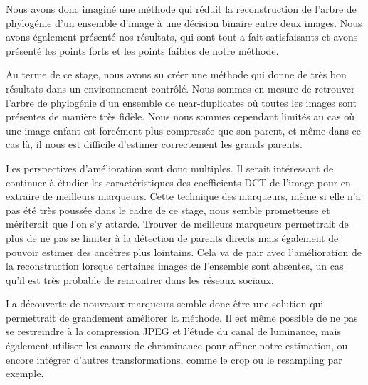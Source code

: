 \documentclass[utf8,final]{stageM2R} %
\begin{document}
Nous avons donc imaginé une méthode qui réduit la reconstruction de l'arbre de phylogénie d'un ensemble d'image à une décision binaire entre deux images. Nous avons également présenté nos résultats, qui sont tout a fait satisfaisants et avons présenté les points forts et les points faibles de notre méthode. 

Au terme de ce stage, nous avons su créer une méthode qui donne de très bon résultats dans un environnement contrôlé. Nous sommes en mesure de retrouver l'arbre de phylogénie d'un ensemble de near-duplicates où toutes les images sont présentes de manière très fidèle. Nous nous sommes cependant limités au cas où une image enfant est forcément plus compressée que son parent, et même dans ce cas là, il nous est difficile d'estimer correctement les grands parents. 

Les perspectives d'amélioration sont donc multiples. Il serait intéressant de continuer à étudier les caractéristiques des coefficients DCT de l'image pour en extraire de meilleurs marqueurs. Cette technique des marqueurs, même si elle n'a pas été très poussée dans le cadre de ce stage, nous semble prometteuse et mériterait que l'on s'y attarde. Trouver de meilleurs marqueurs permettrait de plus de ne pas se limiter à la détection de parents directs mais également de pouvoir estimer des ancêtres plus lointains. Cela va de pair avec l'amélioration de la reconstruction lorsque certaines images de l'ensemble sont absentes, un cas qu'il est très probable de rencontrer dans les réseaux sociaux. 

La découverte de nouveaux marqueurs semble donc être une solution qui permettrait de grandement améliorer la méthode. Il est même possible de ne pas se restreindre à la compression JPEG et l'étude du canal de luminance, mais également utiliser les canaux de chrominance pour affiner notre estimation, ou encore intégrer d'autres transformations, comme le crop ou le resampling par exemple.

\printbibliography
\end{document}

